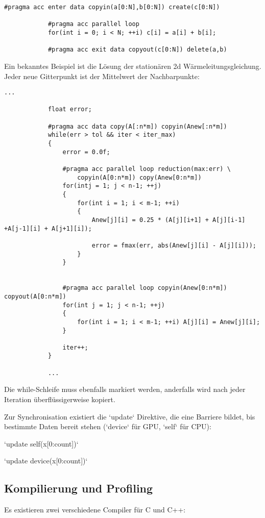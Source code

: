 			\begin{lstlisting}[caption=OpenACC: Speicherverwaltung]
			#pragma acc enter data copyin(a[0:N],b[0:N]) create(c[0:N])
			
			#pragma acc parallel loop
			for(int i = 0; i < N; ++i) c[i] = a[i] + b[i];
			
			#pragma acc exit data copyout(c[0:N]) delete(a,b)
			\end{lstlisting}
			
			Ein bekanntes Beispiel ist die Lösung der stationären 2d Wärmeleitungsgleichung. Jeder neue Gitterpunkt ist der Mittelwert der Nachbarpunkte:
			\begin{lstlisting}[caption=OpenACC: Wärmeleitungsgleichung]
			...
			
			float error;
			
			#pragma acc data copy(A[:n*m]) copyin(Anew[:n*m]) 
			while(err > tol && iter < iter_max) 
			{
				error = 0.0f;
				
				#pragma acc parallel loop reduction(max:err) \
					copyin(A[0:n*m]) copy(Anew[0:n*m])
				for(intj = 1; j < n-1; ++j) 
				{
					for(int i = 1; i < m-1; ++i) 
					{
						Anew[j][i] = 0.25 * (A[j][i+1] + A[j][i-1] +A[j-1][i] + A[j+1][i]);
						
						error = fmax(err, abs(Anew[j][i] - A[j][i]));
					}
				}
				
		
				#pragma acc parallel loop copyin(Anew[0:n*m]) copyout(A[0:n*m])
				for(int j = 1; j < n-1; ++j) 
				{
					for(int i = 1; i < m-1; ++i) A[j][i] = Anew[j][i];
				}
				
				iter++;
			}
			
			...
			\end{lstlisting}
			
			Die while-Schleife muss ebenfalls markiert werden, anderfalls wird nach jeder Iteration überflüssigerweise kopiert.
			
			Zur Synchronisation existiert die \li`update` Direktive, die eine Barriere bildet, bis bestimmte Daten bereit stehen (\li`device` für GPU, \li`self` für CPU):
			
			\begin{center} 
			\li`update self(x[0:count])`
			
			\li`update device(x[0:count])`
			\end{center}
			
			\subsection{Kompilierung und Profiling}\label{komp}
			Es existieren zwei verschiedene Compiler für C und C++:
			
